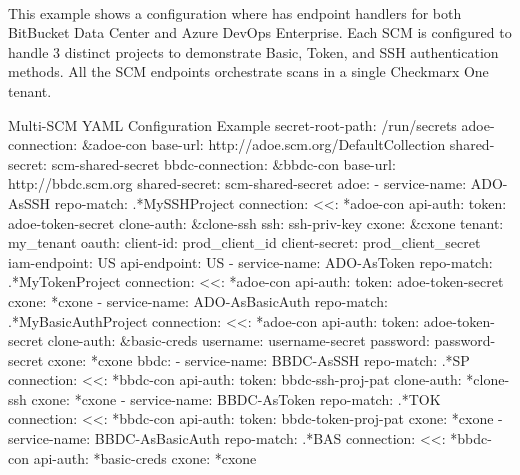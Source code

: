 \noindent\\This example shows a configuration where \cxoneflow has endpoint handlers for both
BitBucket Data Center and Azure DevOps Enterprise.  Each SCM is configured to handle 3 distinct
projects to demonstrate Basic, Token, and SSH authentication methods.  All the SCM endpoints
orchestrate scans in a single Checkmarx One tenant.

\begin{code}{Multi-SCM YAML Configuration Example}{}{}
secret-root-path: /run/secrets
adoe-connection: &adoe-con
    base-url: http://adoe.scm.org/DefaultCollection
    shared-secret: scm-shared-secret
bbdc-connection: &bbdc-con
    base-url: http://bbdc.scm.org
    shared-secret: scm-shared-secret
adoe:
    - service-name: ADO-AsSSH
        repo-match: .*MySSHProject
        connection:
        <<: *adoe-con
        api-auth: 
            token: adoe-token-secret
        clone-auth: &clone-ssh
            ssh: ssh-priv-key
        cxone: &cxone
        tenant: my_tenant
        oauth:
            client-id: prod_client_id
            client-secret: prod_client_secret
        iam-endpoint: US
        api-endpoint: US
    - service-name: ADO-AsToken
        repo-match: .*MyTokenProject
        connection:
        <<: *adoe-con
        api-auth:
            token: adoe-token-secret
        cxone: *cxone
    - service-name: ADO-AsBasicAuth
        repo-match: .*MyBasicAuthProject
        connection:
        <<: *adoe-con
        api-auth:
            token: adoe-token-secret
        clone-auth: &basic-creds
            username: username-secret
            password: password-secret
        cxone: *cxone
bbdc:
    - service-name: BBDC-AsSSH
        repo-match: .*SP
        connection:
        <<: *bbdc-con
        api-auth: 
            token: bbdc-ssh-proj-pat
        clone-auth: *clone-ssh
        cxone: *cxone
    - service-name: BBDC-AsToken
        repo-match: .*TOK
        connection:
        <<: *bbdc-con
        api-auth:
            token: bbdc-token-proj-pat
        cxone: *cxone
    - service-name: BBDC-AsBasicAuth
        repo-match: .*BAS
        connection:
        <<: *bbdc-con
        api-auth: *basic-creds
        cxone: *cxone
\end{code}
